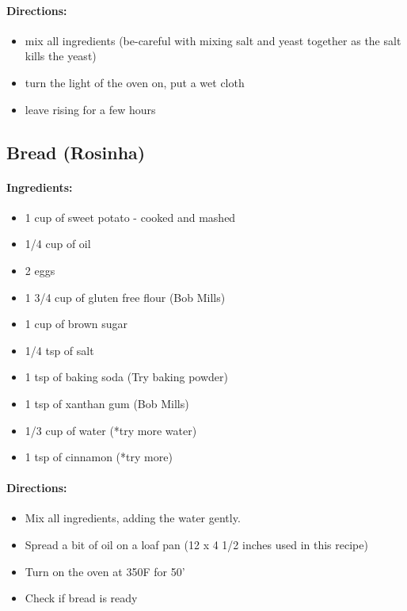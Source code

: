 \documentclass{article}
\begin{document}
\paragraph{Directions:}
\begin{itemize}
    \item mix all ingredients (be-careful with mixing salt and yeast together as the salt kills the yeast)
    \item turn the light of the oven on, put a wet cloth
    \item leave rising for a few hours
\end{itemize}

\subsection{Bread (Rosinha)}

\paragraph{Ingredients:}
\begin{itemize}
    \item 1 cup of sweet potato - cooked and mashed
    \item 1/4 cup of oil
    \item 2 eggs
    \item 1 3/4 cup of gluten free flour (Bob Mills)
    \item 1 cup of brown sugar
    \item 1/4 tsp of salt
    \item 1 tsp of baking soda (Try baking powder)
    \item 1 tsp of xanthan gum (Bob Mills)
    \item 1/3 cup of water (*try more water)
    \item 1 tsp of cinnamon (*try more)
\end{itemize}

\paragraph{Directions:}
\begin{itemize}
    \item Mix all ingredients, adding the water gently.
    \item Spread a bit of oil on a loaf pan (12 x 4 1/2 inches used in this recipe)
    \item Turn on the oven at 350F for 50'
    \item Check if bread is ready
\end{itemize}
\end{document}

